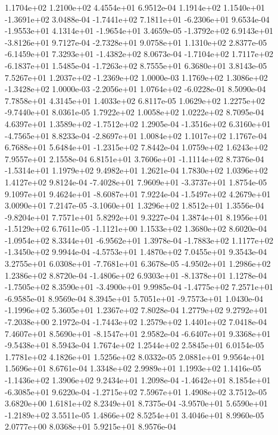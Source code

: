 1.1704e+02 1.2100e+02 4.4554e+01  6.9512e-04
 1.1914e+02  1.1540e+01 -1.3691e+02  3.0488e-04
-1.7441e+02  7.1811e+01 -6.2306e+01  9.6534e-04
-1.9553e+01  4.1314e+01 -1.9654e+01  3.4659e-05
-1.3792e+02  6.9143e+01 -3.8126e+01  9.7127e-04
-2.7328e+01  9.0758e+01  1.1310e+02  2.8377e-05
-6.1459e+01  7.3293e+01 -1.4382e+02  8.0673e-04
-1.7104e+02  1.7117e+02 -6.1837e+01  1.5485e-04
-1.7263e+02  8.7555e+01  6.3680e+01  3.8143e-05
 7.5267e+01  1.2037e+02 -1.2369e+02  1.0000e-03
 1.1769e+02  1.3086e+02 -1.3428e+02  1.0000e-03
-2.2056e+01  1.0764e+02 -6.0228e-01  8.5090e-04
7.7858e+01 4.3145e+01 1.4033e+02  6.8117e-05
 1.0629e+02  1.2275e+02 -9.7440e+01  8.0361e-05
1.7922e+02 1.0058e+02 1.0222e+02  8.7095e-04
 4.6397e+01  1.3589e+02 -1.7512e+02  1.2905e-04
-1.3516e+02  6.3160e+01 -4.7565e+01  8.8233e-04
-2.8697e+01  1.0084e+02  1.1017e+02  1.1767e-04
 6.7688e+01  5.6484e+01 -1.2315e+02  7.8442e-04
1.0759e+02 1.6243e+02 7.9557e+01  2.1558e-04
 6.8151e+01  3.7606e+01 -1.1114e+02  8.7376e-04
-1.5314e+01  1.1979e+02  9.4982e+01  1.2621e-04
1.7830e+02 1.0396e+02 1.4127e+02  9.8124e-04
-7.4028e+01  7.9609e+01 -3.3737e+01  1.8754e-05
 9.1097e+01  9.4624e+01 -8.6087e+01  7.9224e-04
-1.5497e+02  4.2679e+01  3.0090e+01  7.2147e-05
-3.1060e+01  1.3296e+02  1.8512e+01  1.3556e-04
-9.8204e+01  7.7571e+01  5.8292e+01  9.3227e-04
 1.3874e+01  8.1956e+01 -1.5129e+02  6.7611e-05
-1.1121e+00  1.1533e+02  1.3680e+02  8.6020e-04
-1.0954e+02  8.3344e+01 -6.9562e+01  1.3978e-04
-1.7883e+02  1.1177e+02 -1.3450e+02  9.9944e-04
-4.5753e+01  1.4870e+02  7.0455e+01  9.3543e-04
 3.2755e+01  6.0308e+01 -7.7681e+01  6.3678e-05
-4.9502e+01  1.2986e+02  1.2386e+02  8.8720e-04
-1.4806e+02  6.9303e+01 -8.1378e+01  1.1278e-04
-1.7505e+02  8.3590e+01 -3.4900e+01  9.9985e-04
-1.4775e+02  7.2571e+01 -6.9585e-01  8.9569e-04
 8.3945e+01  5.7051e+01 -9.7573e+01  1.0430e-04
-1.1996e+02  5.3605e+01  1.2367e+02  7.8028e-04
 1.2779e+02  9.2792e+01 -7.2038e+00  2.1972e-04
-1.7443e+02  1.2579e+02  1.4401e+02  7.0418e-04
 7.4607e+01  8.5690e+01 -8.1547e+01  2.9582e-04
-6.6407e+01  9.3368e+01 -9.5438e+01  8.5943e-04
1.7674e+02 1.2544e+02 2.5845e+01  6.0154e-05
1.7781e+02 4.1826e+01 1.5256e+02  8.0332e-05
2.0881e+01 9.9564e+01 1.5696e+01  8.6761e-04
1.3348e+02 2.9989e+01 1.1993e+02  1.1416e-05
-1.1436e+02  1.3906e+02  9.2434e+01  1.2098e-04
-1.4642e+01  8.1854e+01 -6.3085e+01  9.6220e-04
-1.2715e+02  7.5967e+01  1.4908e+02  3.7512e-05
3.6820e+00 1.6181e+02 8.2349e+01  8.7375e-04
-3.9570e+01  5.6590e+01 -1.2189e+02  3.5511e-05
1.4866e+02 8.5254e+01 3.4046e+01  8.9960e-05
2.0777e+00 8.0368e+01 5.9215e+01  8.9576e-04
